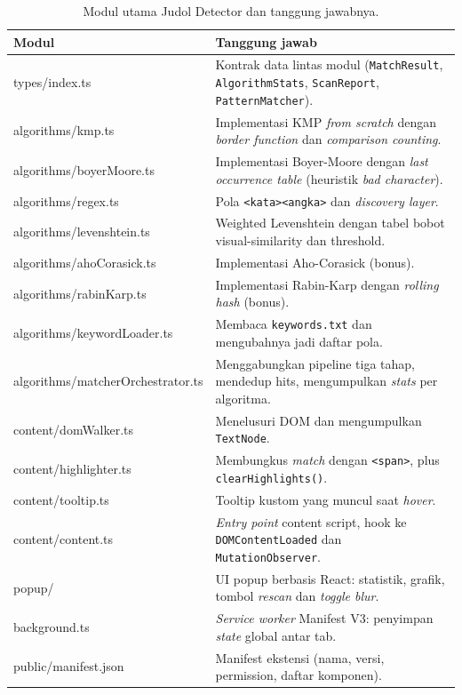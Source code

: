 \documentclass[11pt,a4paper]{article}
\begin{document}
\begin{table}[H]
    \centering
    \caption{Modul utama Judol Detector dan tanggung jawabnya.}
    \label{tab:modules}
    \renewcommand{\arraystretch}{1.15}
    \begin{tabularx}{\textwidth}{>{\ttfamily\small\raggedright\arraybackslash}p{4.8cm}|X}
        \toprule
        \textnormal{\textbf{Modul}} & \textbf{Tanggung jawab} \\
        \midrule
        types/\allowbreak index.ts & Kontrak data lintas modul (\texttt{MatchResult}, \texttt{AlgorithmStats},
        \texttt{ScanReport}, \texttt{PatternMatcher}). \\
        algorithms/\allowbreak kmp.ts & Implementasi KMP \textit{from scratch} dengan \textit{border function} dan
        \textit{comparison counting}. \\
        algorithms/\allowbreak boyerMoore.ts & Implementasi Boyer-Moore dengan \textit{last occurrence table} (heuristik
        \textit{bad character}). \\
        algorithms/\allowbreak regex.ts & Pola \texttt{<kata><angka>} dan \textit{discovery layer}. \\
        algorithms/\allowbreak levenshtein.ts & Weighted Levenshtein dengan tabel bobot visual-similarity dan threshold. \\
        algorithms/\allowbreak ahoCorasick.ts & Implementasi Aho-Corasick (bonus). \\
        algorithms/\allowbreak rabinKarp.ts & Implementasi Rabin-Karp dengan \textit{rolling hash} (bonus). \\
        algorithms/\allowbreak keywordLoader.ts & Membaca \texttt{keywords.txt} dan mengubahnya jadi daftar pola. \\
        algorithms/\allowbreak matcherOrchestrator.ts & Menggabungkan pipeline tiga tahap, mendedup hits, mengumpulkan
        \textit{stats} per algoritma. \\
        content/\allowbreak domWalker.ts & Menelusuri DOM dan mengumpulkan \texttt{TextNode}. \\
        content/\allowbreak highlighter.ts & Membungkus \textit{match} dengan \texttt{<span>}, plus
        \texttt{clearHighlights()}. \\
        content/\allowbreak tooltip.ts & Tooltip kustom yang muncul saat \textit{hover}. \\
        content/\allowbreak content.ts & \textit{Entry point} content script, hook ke \texttt{DOMContentLoaded} dan
        \texttt{MutationObserver}. \\
        popup/ & UI popup berbasis React: statistik, grafik, tombol \textit{rescan} dan \textit{toggle blur}. \\
        background.ts & \textit{Service worker} Manifest V3: penyimpan \textit{state} global antar tab. \\
        public/\allowbreak manifest.json & Manifest ekstensi (nama, versi, permission, daftar komponen). \\
        \bottomrule
    \end{tabularx}
\end{table}
\end{document}
